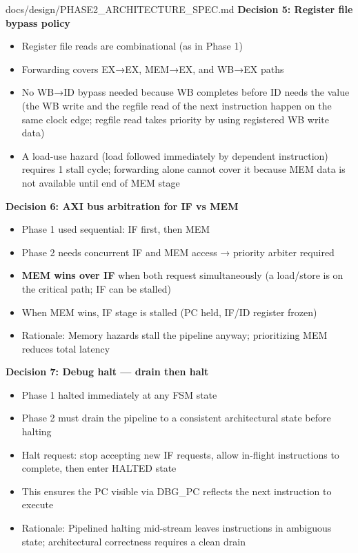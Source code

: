 \begin{relocated}{docs/design/PHASE2_ARCHITECTURE_SPEC.md}
\textbf{Decision 5: Register file bypass policy}

\begin{itemize}
\tightlist
\item
  Register file reads are combinational (as in Phase 1)
\item
  Forwarding covers EX→EX, MEM→EX, and WB→EX paths
\item
  No WB→ID bypass needed because WB completes before ID needs the value
  (the WB write and the regfile read of the next instruction happen on
  the same clock edge; regfile read takes priority by using registered
  WB write data)
\item
  A load-use hazard (load followed immediately by dependent instruction)
  requires 1 stall cycle; forwarding alone cannot cover it because MEM
  data is not available until end of MEM stage
\end{itemize}

\textbf{Decision 6: AXI bus arbitration for IF vs MEM}

\begin{itemize}
\tightlist
\item
  Phase 1 used sequential: IF first, then MEM
\item
  Phase 2 needs concurrent IF and MEM access → priority arbiter required
\item
  \textbf{MEM wins over IF} when both request simultaneously (a
  load/\allowbreak{}store is on the critical path; IF can be stalled)
\item
  When MEM wins, IF stage is stalled (PC held, IF/ID register frozen)
\item
  Rationale: Memory hazards stall the pipeline anyway; prioritizing MEM
  reduces total latency
\end{itemize}

\textbf{Decision 7: Debug halt --- drain then halt}

\begin{itemize}
\tightlist
\item
  Phase 1 halted immediately at any FSM state
\item
  Phase 2 must drain the pipeline to a consistent architectural state
  before halting
\item
  Halt request: stop accepting new IF requests, allow in-flight
  instructions to complete, then enter HALTED state
\item
  This ensures the PC visible via DBG\_PC reflects the next instruction
  to execute
\item
  Rationale: Pipelined halting mid-stream leaves instructions in
  ambiguous state; architectural correctness requires a clean drain
\end{itemize}


\end{relocated}
